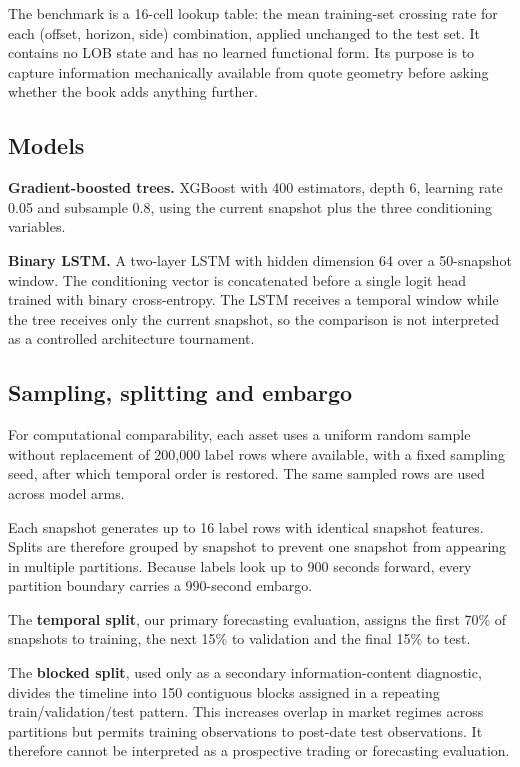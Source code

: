 \documentclass[11pt]{article}
\begin{document}
The benchmark is a 16-cell lookup table: the mean training-set crossing rate for
each (offset, horizon, side) combination, applied unchanged to the test set. It
contains no LOB state and has no learned functional form. Its purpose is to
capture information mechanically available from quote geometry before asking
whether the book adds anything further.

\subsection{Models}

\textbf{Gradient-boosted trees.} XGBoost with 400 estimators, depth 6, learning
rate 0.05 and subsample 0.8, using the current snapshot plus the three
conditioning variables.

\textbf{Binary LSTM.} A two-layer LSTM with hidden dimension 64 over a
50-snapshot window. The conditioning vector is concatenated before a single
logit head trained with binary cross-entropy. The LSTM receives a temporal
window while the tree receives only the current snapshot, so the comparison is
not interpreted as a controlled architecture tournament.

\subsection{Sampling, splitting and embargo}
\label{sec:split}

For computational comparability, each asset uses a uniform random sample without
replacement of 200{,}000 label rows where available, with a fixed sampling seed,
after which temporal order is restored. The same sampled rows are used across
model arms.

Each snapshot generates up to 16 label rows with identical snapshot features.
Splits are therefore grouped by snapshot to prevent one snapshot from appearing
in multiple partitions. Because labels look up to 900 seconds forward, every
partition boundary carries a 990-second embargo.

The \textbf{temporal split}, our primary forecasting evaluation, assigns the
first 70\% of snapshots to training, the next 15\% to validation and the final
15\% to test.

The \textbf{blocked split}, used only as a secondary information-content
diagnostic, divides the timeline into 150 contiguous blocks assigned in a
repeating train/validation/test pattern. This increases overlap in market
regimes across partitions but permits training observations to post-date test
observations. It therefore cannot be interpreted as a prospective trading or
forecasting evaluation.
\end{document}
